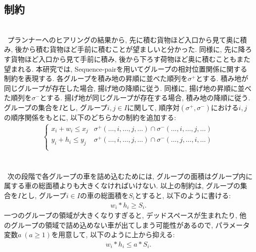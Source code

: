\subsection{制約}
\\
\ プランナーへのヒアリングの結果から, 先に積む貨物ほど入口から見て奥に積み, 後から積む貨物ほど手前に積むことが望ましいと分かった. 
同様に, 先に降ろす貨物ほど入口から見て手前に積み, 後から下ろす荷物ほど奥に積むこともまた望まれる. 
本研究では, Sequence-pairを用いてグループの相対位置関係に関する制約を表現する. 
各グループを積み地の昇順に並べた順列を$\sigma^+$とする. 
積み地が同じグループが存在した場合, 揚げ地の降順に従う. 
同様に, 揚げ地の昇順に並べた順列を$\sigma^-$とする. 
揚げ地が同じグループが存在する場合, 積み地の降順に従う. \\
グループの集合を$I$とし, グループ$i,j \in I$に関して, 順序対$(\sigma^+,\sigma^-)$における$i,j$の順序関係をもとに, 以下のどちらかの制約を追加する: \\
\begin{eqnarray}
    \left\{
        \begin{array}{ll}
            x_i + w_i \leq x_j & \sigma^+(\ldots,i,\ldots,j,\ldots) \cap \sigma^-(\ldots,i,\ldots,j,\ldots) \\
            y_i + h_i \leq y_j & \sigma^+(\ldots,i,\ldots,j,\ldots) \cap \sigma^-(\ldots,j,\ldots,i,\ldots) \\
        \end{array}
    \right.
\end{eqnarray}\\


\\
\ 次の段階で各グループの車を詰め込むためには, グループの面積はグループ内に属する車の総面積よりも大きくなければいけない. 
以上の制約は, グループの集合を$I$とし, グループ$i \in I$の車の総面積を$S_i$とすると, 以下のように書ける: \\
\begin{eqnarray}
    w_i*h_i \geq S_i . 
\end{eqnarray}
一つのグループの領域が大きくなりすぎると, デッドスペースが生まれたり, 他のグループの領域で詰め込めない車が出てしまう可能性があるので, パラメータ変数$a\ (a \geq 1)$を用意して, 以下のように上から抑える: 
\begin{eqnarray}
    w_i*h_i \leq a*S_i.
    \label{a_const}
\end{eqnarray}\\

